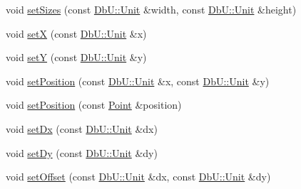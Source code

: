\begin{DoxyCompactItemize}
\item 
void \hyperlink{classHurricane_1_1Contact_aa18aa1e78eba9f4c10ece0e20683faf5}{set\+Sizes} (const \hyperlink{group__DbUGroup_ga4fbfa3e8c89347af76c9628ea06c4146}{Db\+U\+::\+Unit} \&width, const \hyperlink{group__DbUGroup_ga4fbfa3e8c89347af76c9628ea06c4146}{Db\+U\+::\+Unit} \&height)
\item 
void \hyperlink{classHurricane_1_1Contact_a181436f128b65467e1ab94ffcb0c345b}{setX} (const \hyperlink{group__DbUGroup_ga4fbfa3e8c89347af76c9628ea06c4146}{Db\+U\+::\+Unit} \&x)
\item 
void \hyperlink{classHurricane_1_1Contact_a455b8925aae10157c9143b58a3a52e57}{setY} (const \hyperlink{group__DbUGroup_ga4fbfa3e8c89347af76c9628ea06c4146}{Db\+U\+::\+Unit} \&y)
\item 
void \hyperlink{classHurricane_1_1Contact_afac88ee8442e3e943a24bb526057851a}{set\+Position} (const \hyperlink{group__DbUGroup_ga4fbfa3e8c89347af76c9628ea06c4146}{Db\+U\+::\+Unit} \&x, const \hyperlink{group__DbUGroup_ga4fbfa3e8c89347af76c9628ea06c4146}{Db\+U\+::\+Unit} \&y)
\item 
void \hyperlink{classHurricane_1_1Contact_ad3ff25d47d1c00c53bb07bb0ff4067f1}{set\+Position} (const \hyperlink{classHurricane_1_1Point}{Point} \&position)
\item 
void \hyperlink{classHurricane_1_1Contact_a6ee60b9d228fe5487bf73dc396b94706}{set\+Dx} (const \hyperlink{group__DbUGroup_ga4fbfa3e8c89347af76c9628ea06c4146}{Db\+U\+::\+Unit} \&dx)
\item 
void \hyperlink{classHurricane_1_1Contact_a32ee96c21115ee9d197bc505fd48e37d}{set\+Dy} (const \hyperlink{group__DbUGroup_ga4fbfa3e8c89347af76c9628ea06c4146}{Db\+U\+::\+Unit} \&dy)
\item 
void \hyperlink{classHurricane_1_1Contact_a41ba972136e77d768f58ad0407d18f8e}{set\+Offset} (const \hyperlink{group__DbUGroup_ga4fbfa3e8c89347af76c9628ea06c4146}{Db\+U\+::\+Unit} \&dx, const \hyperlink{group__DbUGroup_ga4fbfa3e8c89347af76c9628ea06c4146}{Db\+U\+::\+Unit} \&dy)
\end{DoxyCompactItemize}
